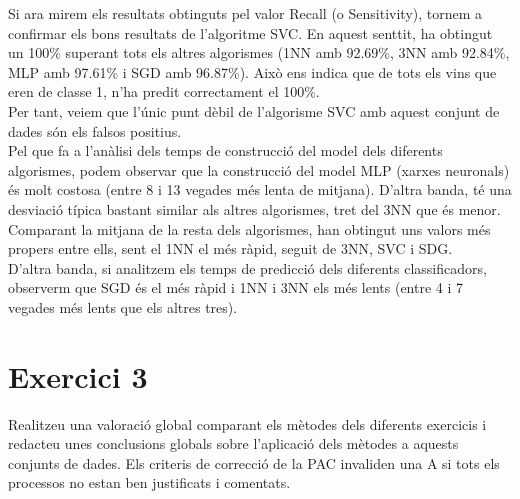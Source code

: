 \documentclass{article} %
\begin{document}
{	Si ara mirem els resultats obtinguts pel valor Recall (o Sensitivity), tornem a confirmar els bons resultats de l'algoritme SVC. En aquest senttit, ha obtingut un 100\% superant tots els altres algorismes (1NN amb 92.69\%, 3NN amb 92.84\%, MLP amb 97.61\% i SGD amb 96.87\%). Això ens indica que de tots els vins que eren de classe 1, n'ha predit correctament el 100\%. \\

	Per tant, veiem que l'únic punt dèbil de l'algorisme SVC amb aquest conjunt de dades són els falsos positius. \\

	Pel que fa a l'anàlisi dels temps de construcció del model dels diferents algorismes, podem observar que la construcció del model MLP (xarxes neuronals) és molt costosa (entre 8 i 13 vegades més lenta de mitjana). D'altra banda, té una desviació típica bastant similar als altres algorismes, tret del 3NN que és menor. Comparant la mitjana de la resta dels algorismes, han obtingut uns valors més propers entre ells, sent el 1NN el més ràpid, seguit de 3NN, SVC i SDG. \\

	D'altra banda, si analitzem els temps de predicció dels diferents classificadors, observerm que SGD és el més ràpid i 1NN i 3NN els més lents (entre 4 i 7 vegades més lents que els altres tres). \\
}

\section{Exercici 3}
Realitzeu una valoració global comparant els mètodes dels diferents exercicis i redacteu unes conclusions globals sobre l'aplicació dels mètodes a aquests conjunts de dades. Els criteris de correcció de la PAC invaliden una A si tots els processos no estan ben justificats i comentats. \\
\end{document}
